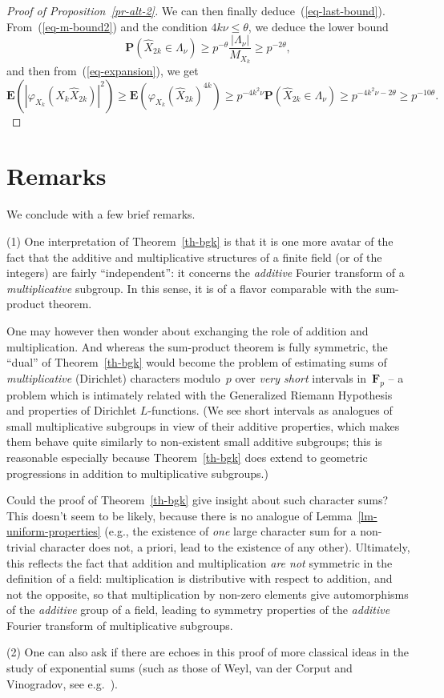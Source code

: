 \documentclass[12pt]{amsart}
\renewcommand{\leq}{\leqslant}
\renewcommand{\geq}{\geqslant}
\numberwithin{equation}{section}
\newcommand{\Ff}{\mathbf{F}}
\newcommand{\proba}{\mathbf{P}}
\newcommand{\expect}{\mathbf{E}}
\theoremstyle{plain}
\theoremstyle{remark}
\theoremstyle{definition}
\renewcommand{\geq}{\geqslant}
\renewcommand{\leq}{\leqslant}
\begin{document}
\begin{proof}[Proof of Proposition~\ref{pr-alt-2}]
We can then finally
deduce~(\ref{eq-last-bound}). From~(\ref{eq-m-bound2}) and the condition
$4k\nu\leq \theta$, we deduce the lower bound
$$
\proba(\widehat{X}_{2k}\in\Lambda_{\nu})\geq
p^{-\theta}\frac{|\Lambda_{\nu}|}{M_{X_k}}\geq p^{-2\theta},
$$
and then from~(\ref{eq-expansion}), we get
$$
\expect(|\varphi_{X_k}(X_k\widehat{X}_{2k})|^2) \geq
\expect(\varphi_{X_k}(\widehat{X}_{2k})^{4k}) \geq
p^{-4k^2\nu}\proba(\widehat{X}_{2k}\in\Lambda_{\nu}) \geq p^{-4k^2\nu
  -2\theta}\geq p^{-10\theta}.
$$
\end{proof}


\section{Remarks}

We conclude with a few brief remarks.
\par
(1) One interpretation of Theorem~\ref{th-bgk} is that it is one more
avatar of the fact that the additive and multiplicative structures of a
finite field (or of the integers) are fairly ``independent'': it
concerns the \emph{additive} Fourier transform of a
\emph{multiplicative} subgroup.  In this sense, it is of a flavor
comparable with the sum-product theorem.

One may however then wonder about exchanging the role of addition and
multiplication. And whereas the sum-product theorem is fully symmetric,
the ``dual'' of Theorem~\ref{th-bgk} would become the problem of
estimating sums of \emph{multiplicative} (Dirichlet) characters
modulo~$p$ over \emph{very short} intervals in~$\Ff_p$ -- a problem
which is intimately related with the Generalized Riemann Hypothesis and
properties of Dirichlet $L$-functions. (We see short intervals as
analogues of small multiplicative subgroups in view of their additive
properties, which makes them behave quite similarly to non-existent
small additive subgroups; this is reasonable especially because
Theorem~\ref{th-bgk} does extend to geometric progressions in addition
to multiplicative subgroups.)

Could the proof of Theorem~\ref{th-bgk} give insight about such
character sums?  This doesn't seem to be likely, because there is no
analogue of Lemma~\ref{lm-uniform-properties} (e.g., the existence of
\emph{one} large character sum for a non-trivial character does not, a
priori, lead to the existence of any other). Ultimately, this reflects
the fact that addition and multiplication \emph{are not} symmetric in
the definition of a field: multiplication is distributive with respect
to addition, and not the opposite, so that multiplication by non-zero
elements give automorphisms of the \emph{additive} group of a field,
leading to symmetry properties of the \emph{additive} Fourier transform
of multiplicative subgroups.
\par
(2) One can also ask if there are echoes in this proof of more classical
ideas in the study of exponential sums (such as those of Weyl, van der
Corput and Vinogradov, see e.g.~\cite[Ch.\,8]{ant}).
\end{document}

